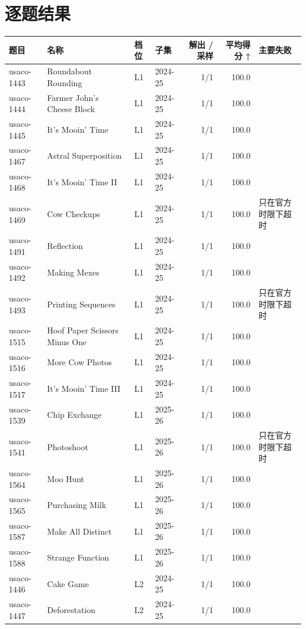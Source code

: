 \documentclass[11pt,a4paper,fontset=none]{ctexart}
\begin{document}
\section{逐题结果}
{\footnotesize\setlength{\tabcolsep}{4pt}\begin{longtable}{@{}l>{\raggedright\arraybackslash}p{3.4cm}llrr>{\raggedright\arraybackslash}p{3.1cm}@{}}
\toprule
题目 & 名称 & 档位 & 子集 & 解出 / 采样 & 平均得分 ↑ & 主要失败 \\
\midrule\endhead
usaco-1443 & Roundabout Rounding & L1 & 2024-25 & 1/1 & 100.0 &  \\
usaco-1444 & Farmer John's Cheese Block & L1 & 2024-25 & 1/1 & 100.0 &  \\
usaco-1445 & It's Mooin' Time & L1 & 2024-25 & 1/1 & 100.0 &  \\
usaco-1467 & Astral Superposition & L1 & 2024-25 & 1/1 & 100.0 &  \\
usaco-1468 & It's Mooin' Time II & L1 & 2024-25 & 1/1 & 100.0 &  \\
usaco-1469 & Cow Checkups & L1 & 2024-25 & 1/1 & 100.0 & 只在官方时限下超时 \\
usaco-1491 & Reflection & L1 & 2024-25 & 1/1 & 100.0 &  \\
usaco-1492 & Making Mexes & L1 & 2024-25 & 1/1 & 100.0 &  \\
usaco-1493 & Printing Sequences & L1 & 2024-25 & 1/1 & 100.0 & 只在官方时限下超时 \\
usaco-1515 & Hoof Paper Scissors Minus One & L1 & 2024-25 & 1/1 & 100.0 &  \\
usaco-1516 & More Cow Photos & L1 & 2024-25 & 1/1 & 100.0 &  \\
usaco-1517 & It's Mooin' Time III & L1 & 2024-25 & 1/1 & 100.0 &  \\
usaco-1539 & Chip Exchange & L1 & 2025-26 & 1/1 & 100.0 &  \\
usaco-1541 & Photoshoot & L1 & 2025-26 & 1/1 & 100.0 & 只在官方时限下超时 \\
usaco-1564 & Moo Hunt & L1 & 2025-26 & 1/1 & 100.0 &  \\
usaco-1565 & Purchasing Milk & L1 & 2025-26 & 1/1 & 100.0 &  \\
usaco-1587 & Make All Distinct & L1 & 2025-26 & 1/1 & 100.0 &  \\
usaco-1588 & Strange Function & L1 & 2025-26 & 1/1 & 100.0 &  \\
usaco-1446 & Cake Game & L2 & 2024-25 & 1/1 & 100.0 &  \\
usaco-1447 & Deforestation & L2 & 2024-25 & 1/1 & 100.0 &  \\

\end{longtable}}
\end{document}
